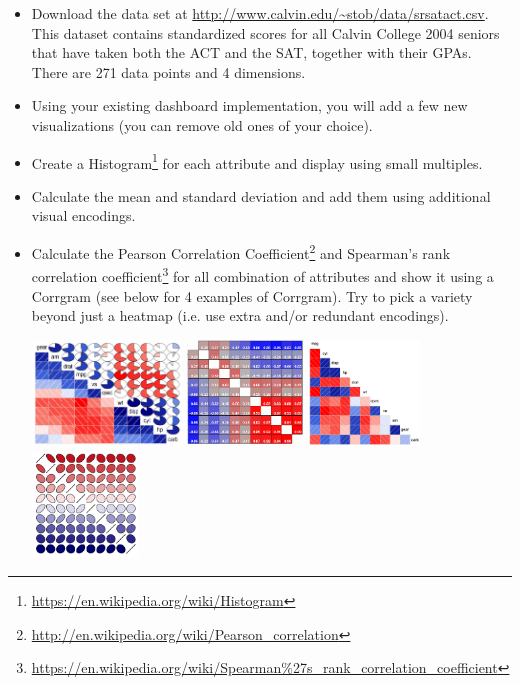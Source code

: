 \documentclass[a4paper,12pt]{article}
\begin{document}
\begin{itemize}

\item Download the data set at \url{
http://www.calvin.edu/~stob/data/srsatact.csv}. This dataset contains standardized scores for all Calvin College 2004 seniors that have taken both the ACT and the SAT, together with their GPAs. There are 271 data points and 4 dimensions.

\item Using your existing dashboard implementation, you will add a few new visualizations (you can remove old ones of your choice).

\item Create a Histogram\footnote{\url{https://en.wikipedia.org/wiki/Histogram}} for each attribute and display using small multiples.

\item Calculate the mean and standard deviation and add them using additional visual encodings.

\item Calculate the Pearson Correlation Coefficient\footnote{\url{http://en.wikipedia.org/wiki/Pearson_correlation}} and Spearman's rank correlation coefficient\footnote{\url{https://en.wikipedia.org/wiki/Spearman\%27s_rank_correlation_coefficient}} for all combination of attributes and show it using a Corrgram (see below for 4 examples of Corrgram). Try to pick a variety beyond just a heatmap (i.e. use extra and/or redundant encodings).

\vspace{15pt}
 \hfill
\includegraphics[height=80pt]{images/corrgram1.png} \hfill
\includegraphics[height=80pt]{images/corrgram2.png} \hfill
\includegraphics[height=80pt]{images/corrgram3.png} \hfill
\includegraphics[height=80pt]{images/corrgram4.png} \hfill
\vspace{10pt}


\end{itemize}
\end{document}
